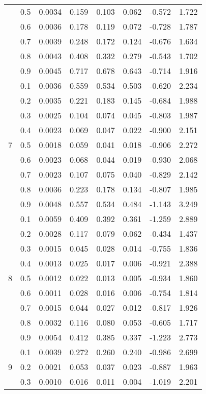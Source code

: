 \documentclass[11pt,a4paper]{report}
\begin{document}
\begin{longtable}{ | c | c || c | c | c | c | c | c | }
 & 0.5 & 0.0034 & 0.159 & 0.103 & 0.062 & -0.572 & 1.722 \\
 & 0.6 & 0.0036 & 0.178 & 0.119 & 0.072 & -0.728 & 1.787 \\
 & 0.7 & 0.0039 & 0.248 & 0.172 & 0.124 & -0.676 & 1.634 \\
 & 0.8 & 0.0043 & 0.408 & 0.332 & 0.279 & -0.543 & 1.702 \\
 & 0.9 & 0.0045 & 0.717 & 0.678 & 0.643 & -0.714 & 1.916 \\
 \hline
\multirow{9}{*}{7} & 0.1 & 0.0036 & 0.559 & 0.534 & 0.503 & -0.620 & 2.234 \\
 & 0.2 & 0.0035 & 0.221 & 0.183 & 0.145 & -0.684 & 1.988 \\
 & 0.3 & 0.0025 & 0.104 & 0.074 & 0.045 & -0.803 & 1.987 \\
 & 0.4 & 0.0023 & 0.069 & 0.047 & 0.022 & -0.900 & 2.151 \\
 & 0.5 & 0.0018 & 0.059 & 0.041 & 0.018 & -0.906 & 2.272 \\
 & 0.6 & 0.0023 & 0.068 & 0.044 & 0.019 & -0.930 & 2.068 \\
 & 0.7 & 0.0023 & 0.107 & 0.075 & 0.040 & -0.829 & 2.142 \\
 & 0.8 & 0.0036 & 0.223 & 0.178 & 0.134 & -0.807 & 1.985 \\
 & 0.9 & 0.0048 & 0.557 & 0.534 & 0.484 & -1.143 & 3.249 \\
 \hline
\multirow{9}{*}{8} & 0.1 & 0.0059 & 0.409 & 0.392 & 0.361 & -1.259 & 2.889 \\
 & 0.2 & 0.0028 & 0.117 & 0.079 & 0.062 & -0.434 & 1.437 \\
 & 0.3 & 0.0015 & 0.045 & 0.028 & 0.014 & -0.755 & 1.836 \\
 & 0.4 & 0.0013 & 0.025 & 0.017 & 0.006 & -0.921 & 2.388 \\
 & 0.5 & 0.0012 & 0.022 & 0.013 & 0.005 & -0.934 & 1.860 \\
 & 0.6 & 0.0011 & 0.028 & 0.016 & 0.006 & -0.754 & 1.814 \\
 & 0.7 & 0.0015 & 0.044 & 0.027 & 0.012 & -0.817 & 1.926 \\
 & 0.8 & 0.0032 & 0.116 & 0.080 & 0.053 & -0.605 & 1.717 \\
 & 0.9 & 0.0054 & 0.412 & 0.385 & 0.337 & -1.223 & 2.773 \\
 \hline
\multirow{9}{*}{9} & 0.1 & 0.0039 & 0.272 & 0.260 & 0.240 & -0.986 & 2.699 \\
 & 0.2 & 0.0021 & 0.053 & 0.037 & 0.023 & -0.887 & 1.963 \\
 & 0.3 & 0.0010 & 0.016 & 0.011 & 0.004 & -1.019 & 2.201 \\

\end{longtable}
\end{document}
